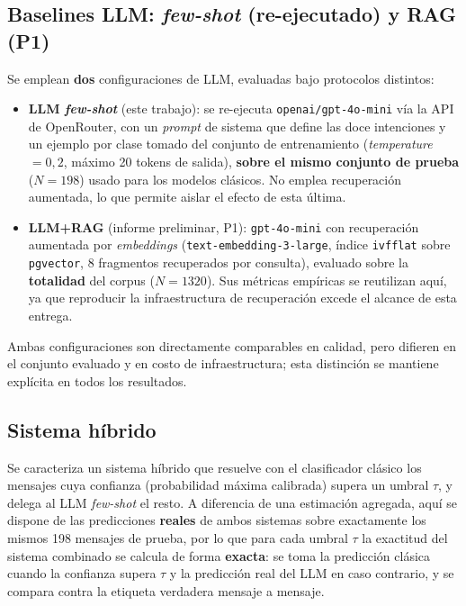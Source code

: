 \documentclass[journal]{IEEEtran}
\newcommand{\code}[1]{\texttt{\small #1}}
\begin{document}
\subsection{Baselines LLM: \emph{few-shot} (re-ejecutado) y RAG (P1)}
Se emplean \textbf{dos} configuraciones de LLM, evaluadas bajo protocolos
distintos:
\begin{itemize}
  \item \textbf{LLM \emph{few-shot}} (este trabajo): se re-ejecuta
  \code{openai/gpt-4o-mini} v\'ia la API de OpenRouter, con un \emph{prompt} de
  sistema que define las doce intenciones y un ejemplo por clase tomado del
  conjunto de entrenamiento (\emph{temperature}$=0{,}2$, m\'aximo 20 tokens de
  salida), \textbf{sobre el mismo conjunto de prueba} ($N=198$) usado para los
  modelos cl\'asicos. No emplea recuperaci\'on aumentada, lo que permite aislar
  el efecto de esta \'ultima.
  \item \textbf{LLM+RAG} (informe preliminar, P1): \code{gpt-4o-mini} con
  recuperaci\'on aumentada por \emph{embeddings} (\code{text-embedding-3-large},
  \'indice \code{ivfflat} sobre \code{pgvector}, 8 fragmentos recuperados por
  consulta), evaluado sobre la \textbf{totalidad} del corpus ($N=1320$). Sus
  m\'etricas emp\'iricas se reutilizan aqu\'i, ya que reproducir la
  infraestructura de recuperaci\'on excede el alcance de esta entrega.
\end{itemize}
Ambas configuraciones son directamente comparables en calidad, pero difieren en
el conjunto evaluado y en costo de infraestructura; esta distinci\'on se mantiene
expl\'icita en todos los resultados.

\subsection{Sistema h\'ibrido}
Se caracteriza un sistema h\'ibrido que resuelve con el clasificador cl\'asico
los mensajes cuya confianza (probabilidad m\'axima calibrada) supera un umbral
$\tau$, y delega al LLM \emph{few-shot} el resto. A diferencia de una
estimaci\'on agregada, aqu\'i se dispone de las predicciones \textbf{reales} de
ambos sistemas sobre exactamente los mismos 198 mensajes de prueba, por lo que
para cada umbral $\tau$ la exactitud del sistema combinado se calcula de forma
\textbf{exacta}: se toma la predicci\'on cl\'asica cuando la confianza supera
$\tau$ y la predicci\'on real del LLM en caso contrario, y se compara contra la
etiqueta verdadera mensaje a mensaje.

\end{document}
